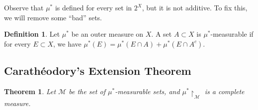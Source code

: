 \documentclass[11pt]{article}
\newtheorem{thm}{Theorem}[section]
\theoremstyle{definition}
\newtheorem{defn}{Definition}[section]
\newcommand{\m}[1]{\mathcal{#1}}
\begin{document}
Observe that $\mu^*$ is defined for every set in $2^X$, but it is not additive. To fix
this, we will remove some ``bad'' sets.

\begin{defn}
    Let $\mu^*$ be an outer measure on $X$.  A set $A\subset X$ is $\mu^*$-measurable if
    for every $E\subset X$, we have $\mu^*(E) = \mu^*(E\cap A) + \mu^*(E\cap A^c)$. 
\end{defn}



\subsection{Carath\'eodory's Extension Theorem}

\begin{thm}
    Let $\m{M}$ be the set of $\mu^*$-measurable sets, and $\mu^*\upharpoonright_\m{M}$ is
    a complete measure. 
\end{thm}
\end{document}
